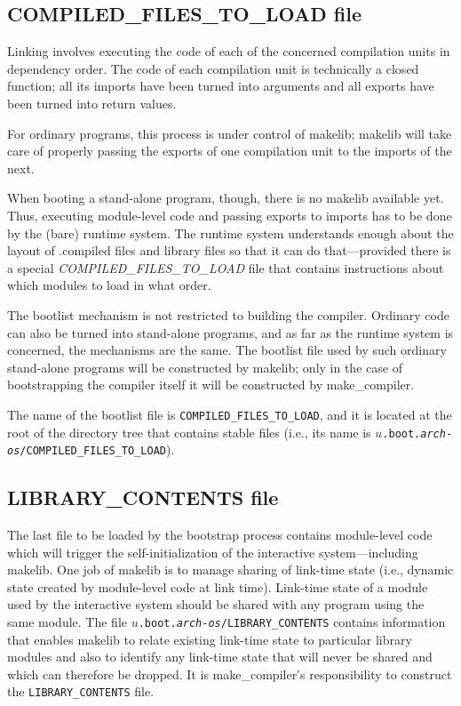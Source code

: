 \subsection{COMPILED_FILES_TO_LOAD file}

Linking involves executing the code of each of the
concerned compilation units in dependency order.  The code of each compilation unit is
technically a closed function; all its imports have been turned into
arguments and all exports have been turned into return values.

For ordinary programs, this process is under control of makelib; makelib will
take care of properly passing the exports of one compilation unit to
the imports of the next.

When booting a stand-alone program, though, there is no makelib available
yet.  Thus, executing module-level code and passing exports to imports
has to be done by the (bare) runtime system.  The runtime system
understands enough about the layout of .compiled files and library files so
that it can do that---provided there is a special {\em COMPILED_FILES_TO_LOAD}
file that contains instructions about which modules to load in what
order.

The bootlist mechanism is not restricted to building the compiler.  Ordinary
code can also be turned into stand-alone programs, and as far as the
runtime system is concerned, the mechanisms are the same.  The
bootlist file used by such ordinary stand-alone programs will be
constructed by makelib; only in the case of bootstrapping the compiler itself it
will be constructed by make_compiler.

The name of the bootlist file is {\tt COMPILED_FILES_TO_LOAD}, and it is located at
the root of the directory tree that contains stable files (i.e., its
name is {\tt $u$.boot.{\it arch}-{\it os}/COMPILED_FILES_TO_LOAD}).

\subsection{LIBRARY_CONTENTS file}

The last file to be loaded by the bootstrap process contains
module-level code which will trigger the self-initialization of the
interactive system---including makelib.  One job of makelib is to manage sharing
of link-time state (i.e., dynamic state created by module-level code
at link time).  Link-time state of a module used by the interactive
system should be shared with any program using the same module.  The
file {\tt $u$.boot.{\it arch}-{\it os}/LIBRARY_CONTENTS} contains information
that enables makelib to relate existing link-time state to particular
library modules and also to identify any link-time state that will
never be shared and which can therefore be dropped.  It is make_compiler's
responsibility to construct the {\tt LIBRARY_CONTENTS} file.

